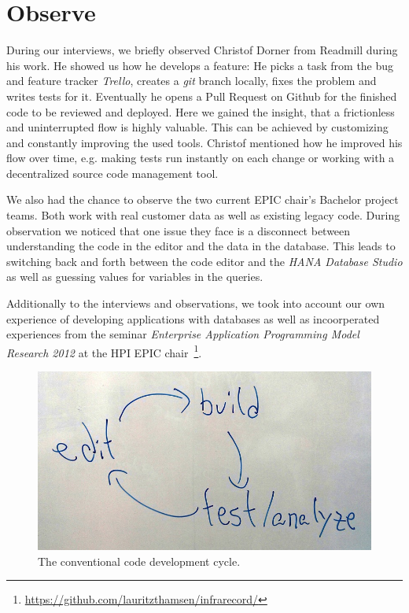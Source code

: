 \section[Observer (Author: Johan Uhle)]{Observe} 
\label{sec:OBSERVE}
During our interviews, we briefly observed Christof Dorner from Readmill during his work. He showed us how he develops a feature: He picks a task from the bug and feature tracker \emph{Trello}, creates a \emph{git} branch locally, fixes the problem and writes tests for it. Eventually he opens a Pull Request on Github for the finished code to be reviewed and deployed. Here we gained the insight, that a frictionless and uninterrupted flow is highly valuable. This can be achieved by customizing and constantly improving the used tools. Christof mentioned how he improved his flow over time, e.g. making tests run instantly on each change or working with a decentralized source code management tool.

We also had the chance to observe the two current EPIC chair's Bachelor project teams. Both work with real customer data as well as existing legacy code. During observation we noticed that one issue they face is a disconnect between understanding the code in the editor and the data in the database. This leads to switching back and forth between the code editor and the \emph{HANA Database Studio} as well as guessing values for variables in the queries.

Additionally to the interviews and observations, we took into account our own experience of developing applications with databases as well as incoorperated experiences from the seminar \emph{Enterprise Application Programming Model Research 2012} at the HPI EPIC chair~\footnote{\url{https://github.com/lauritzthamsen/infrarecord/}}.

\begin{figure}
    \includegraphics[width=\linewidth]{images/EditBuildTest.jpg}
    \caption{The conventional code development cycle.}
    \label{fig:cycle}
\end{figure}

